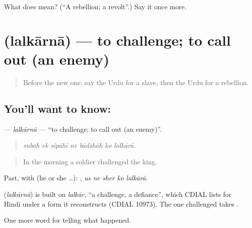\begin{tcolorbox}[breakable,colback=teal!4,colframe=teal!35!black,title={Before you move on}]
What does  mean? (\textquotedblleft{}A rebellion; a revolt\textquotedblright{}.) Say it once more.
\end{tcolorbox}
\section[\texorpdfstring{\ur{للکارنا} (lalkārnā)}{للکارنا (lalkārnā)}]{ (lalkārnā) — to challenge; to call out (an enemy)}

\label{lesson:UR-C312-lalkarna}



\begin{quote}
Before the new one: say the Urdu for a slave, then the Urdu for a rebellion.
\end{quote}

\subsection*{You'll want to know: }
\textbf{} — \emph{lalkārnā} — \textquotedblleft{}to challenge; to call out (an enemy)\textquotedblright{}.

\begin{quote}
      
\end{quote}

\begin{quote}
\emph{subah ek sipāhī ne bādshāh ko lalkārā.}
\end{quote}

\begin{quote}
In the morning a soldier challenged the king.
\end{quote}

Past, with  (he or she …):     , \emph{us ne sher ko lalkārā}.

\begin{cousinweb}
\textbf{} (\emph{lalkārnā}) is built on \emph{lalkār}, \textquotedblleft{}a challenge, a defiance\textquotedblright{}, which CDIAL lists for Hindi under a form it reconstructs (CDIAL 10973). The one challenged takes \textbf{}.
\end{cousinweb}

\begin{grammarlens}[title={What you've built}]
One more word for telling what happened.
\end{grammarlens}

